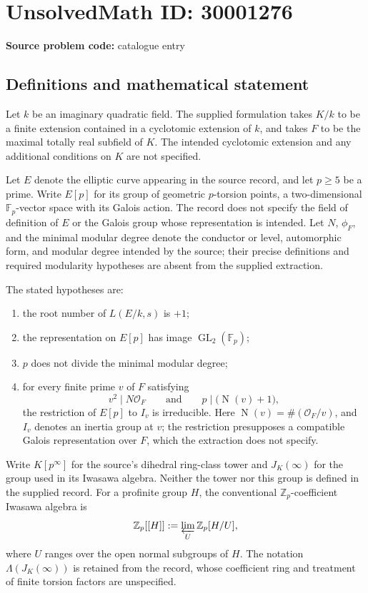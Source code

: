 \documentclass[11pt]{article}
\newcommand{\Z}{\mathbb{Z}}
\newcommand{\F}{\mathbb{F}}
\begin{document}
\section*{UnsolvedMath ID: 30001276}
\textbf{Source problem code:} catalogue entry
\subsection{Definitions and mathematical statement}
Let \(k\) be an imaginary quadratic field. The supplied formulation takes \(K/k\) to be a finite extension contained in a cyclotomic extension of \(k\), and takes \(F\) to be the maximal totally real subfield of \(K\). The intended cyclotomic extension and any additional conditions on \(K\) are not specified.

Let \(E\) denote the elliptic curve appearing in the source record, and let \(p\geq 5\) be a prime. Write \(E[p]\) for its group of geometric \(p\)-torsion points, a two-dimensional \(\F_p\)-vector space with its Galois action. The record does not specify the field of definition of \(E\) or the Galois group whose representation is intended. Let \(N\), \(\phi_F\), and the minimal modular degree denote the conductor or level, automorphic form, and modular degree intended by the source; their precise definitions and required modularity hypotheses are absent from the supplied extraction.

The stated hypotheses are:
\begin{enumerate}
\item the root number of \(L(E/k,s)\) is \(+1\);
\item the representation on \(E[p]\) has image \(\operatorname{GL}_2(\F_p)\);
\item \(p\) does not divide the minimal modular degree;
\item for every finite prime \(v\) of \(F\) satisfying
\[
v^2\mid N\mathcal O_F
\qquad\text{and}\qquad
p\mid\bigl(\operatorname{N}(v)+1\bigr),
\]
the restriction of \(E[p]\) to \(I_v\) is irreducible. Here \(\operatorname{N}(v)=\#(\mathcal O_F/v)\), and \(I_v\) denotes an inertia group at \(v\); the restriction presupposes a compatible Galois representation over \(F\), which the extraction does not specify.
\end{enumerate}

Write \(K[p^\infty]\) for the source's dihedral ring-class tower and \(J_K(\infty)\) for the group used in its Iwasawa algebra. Neither the tower nor this group is defined in the supplied record. For a profinite group \(H\), the conventional \(\Z_p\)-coefficient Iwasawa algebra is
\[
\Z_p[[H]]:=\varprojlim_U\Z_p[H/U],
\]
where \(U\) ranges over the open normal subgroups of \(H\). The notation \(\Lambda(J_K(\infty))\) is retained from the record, whose coefficient ring and treatment of finite torsion factors are unspecified.
\end{document}
